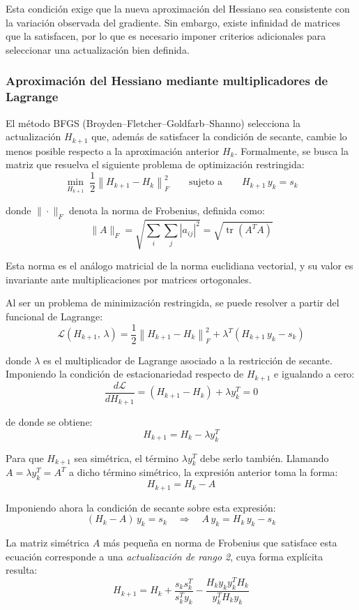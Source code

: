 Esta condición exige que la nueva aproximación del Hessiano sea consistente con la variación observada del gradiente. Sin embargo, existe infinidad de matrices que la satisfacen, por lo que es necesario imponer criterios adicionales para seleccionar una actualización bien definida.

\subsubsection*{Aproximación del Hessiano mediante multiplicadores de Lagrange}

El método BFGS (Broyden--Fletcher--Goldfarb--Shanno) selecciona la actualización \(H_{k+1}\) que, además de satisfacer la condición de secante, cambie lo menos posible respecto a la aproximación anterior \(H_k\). Formalmente, se busca la matriz que resuelva el siguiente problema de optimización restringida:
\[
\min_{H_{k+1}}\; \frac{1}{2}\left\|H_{k+1} - H_k\right\|_F^2
\qquad \text{sujeto a} \qquad H_{k+1}\, y_k = s_k
\]

donde \(\|\cdot\|_F\) denota la norma de Frobenius, definida como:
\[
\|A\|_F = \sqrt{\sum_i \sum_j |a_{ij}|^2} = \sqrt{\operatorname{tr}(A^T A)}
\]

Esta norma es el análogo matricial de la norma euclidiana vectorial, y su valor es invariante ante multiplicaciones por matrices ortogonales.

Al ser un problema de minimización restringida, se puede resolver a partir del funcional de Lagrange:
\[
\mathcal{L}(H_{k+1},\, \lambda)
=
\frac{1}{2}\left\|H_{k+1} - H_k\right\|_F^2
+
\lambda^T\!\left(H_{k+1}\, y_k - s_k\right)
\]

donde \(\lambda\) es el multiplicador de Lagrange asociado a la restricción de secante. Imponiendo la condición de estacionariedad respecto de \(H_{k+1}\) e igualando a cero:
\[
\frac{d\mathcal{L}}{dH_{k+1}}
=
(H_{k+1} - H_k) + \lambda y_k^T
=
0
\]

de donde se obtiene:
\[
H_{k+1} = H_k - \lambda y_k^T
\]

Para que \(H_{k+1}\) sea simétrica, el término \(\lambda y_k^T\) debe serlo también. Llamando \(A = \lambda y_k^T = A^T\) a dicho término simétrico, la expresión anterior toma la forma:
\[
H_{k+1} = H_k - A
\]

Imponiendo ahora la condición de secante sobre esta expresión:
\[
(H_k - A)\, y_k = s_k
\quad\Rightarrow\quad
A\, y_k = H_k\, y_k - s_k
\]

La matriz simétrica \(A\) más pequeña en norma de Frobenius que satisface esta ecuación corresponde a una \textit{actualización de rango 2}, cuya forma explícita resulta:
\[
H_{k+1}
=
H_k
+
\frac{s_k s_k^T}{s_k^T y_k}
-
\frac{H_k y_k y_k^T H_k}{y_k^T H_k y_k}
\]

